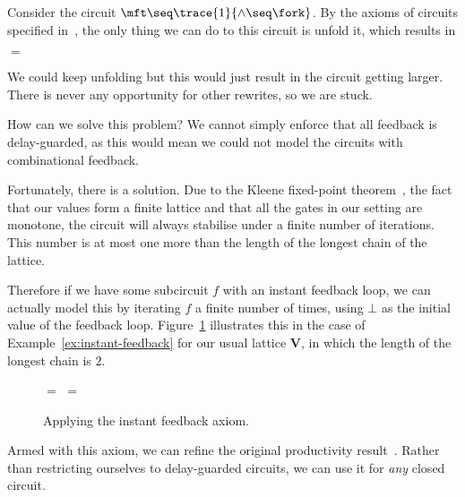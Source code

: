 \documentclass[11pt,numbib]{article}
\begin{document}
\begin{example}\label{ex:instant-feedback}
    Consider the circuit $\mft \seq \trace{1}{\land \seq \fork}$.
    By the axioms of circuits specified in~\cite{ghica2016categorical}, the only thing we can do to this circuit is unfold it, which results in 
    
    \begin{center}
        \quad$=$\quad
    \end{center}

    \noindent
    We could keep unfolding but this would just result in the circuit getting larger.
    There is never any opportunity for other rewrites, so we are stuck.
\end{example}

\noindent
How can we solve this problem?
We cannot simply enforce that all feedback is delay-guarded, as this would mean we could not model the circuits with combinational feedback.

Fortunately, there is a solution.
Due to the Kleene fixed-point theorem~\cite[p.24]{stoltenberg1994mathematical}, the fact that our values form a finite lattice and that all the gates in our setting are monotone, the circuit will always stabilise under a finite number of iterations.
This number is at most one more than the length of the longest chain of the lattice.

Therefore if we have some subcircuit $f$ with an instant feedback loop, we can actually model this by iterating $f$ a finite number of times, using $\bot$ as the initial value of the feedback loop.
Figure~\ref{fig:instant-feedback} illustrates this in the case of Example~\ref{ex:instant-feedback} for our usual lattice $\textbf{V}$, in which the length of the longest chain is $2$.

\begin{figure}[t]
    \centering
    \quad$=$\quad
    \quad$=$\quad
    \caption{Applying the instant feedback axiom.}
    \label{fig:instant-feedback}
\end{figure}

Armed with this axiom, we can refine the original productivity result~\parencite[Theorem 24]{ghica2017diagrammatic}.
Rather than restricting ourselves to delay-guarded circuits, we can use it for \emph{any} closed circuit.
\end{document}
